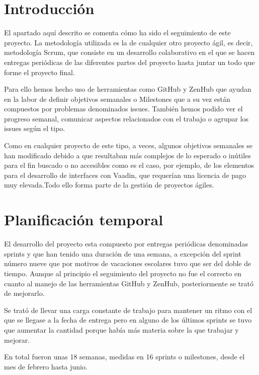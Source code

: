 
\section{Introducción}

El apartado aquí descrito se comenta cómo ha sido el seguimiento de este  proyecto. La metodología utilizada es la de cualquier otro proyecto ágil, es decir, metodología Scrum, que consiste en un desarrollo colaborativo en el que se hacen entregas periódicas de las diferentes partes del proyecto hasta juntar un todo que forme el proyecto final. 

Para ello hemos hecho uso de herramientas como GitHub y ZenHub que ayudan en la labor de definir objetivos semanales o Milestones que a su vez están compuestos por problemas denominados issues. También hemos podido ver el progreso semanal, comunicar aspectos relacionados con el trabajo o agrupar los issues según el tipo.

Como en cualquier proyecto de este tipo, a veces, algunos objetivos semanales se han modificado debido a que resultaban más complejos de lo esperado o inútiles para el fin buscado o no accesibles como es el caso, por ejemplo, de los elementos para el desarrollo de interfaces con Vaadin, que requerían una licencia de pago muy elevada.Todo ello forma parte de la gestión de proyectos ágiles.

\section{Planificación temporal}

El desarrollo del proyecto esta compuesto por entregas periódicas denominadas sprints y que han tenido una duración de una semana, a excepción del sprint número nueve que por motivos de vacaciones escolares tuvo que ser del doble de tiempo. Aunque al principio el seguimiento del proyecto no fue el correcto en cuanto al manejo de las herramientas GitHub  y ZenHub, posteriormente se trató de mejorarlo.

Se trató de llevar una carga constante de trabajo para mantener un ritmo con el que se llegase a la fecha de entrega pero en alguno de los últimos sprints se tuvo que aumentar la cantidad porque había más materia sobre la que trabajar y mejorar.

En total fueron unas 18 semanas, medidas en 16 sprints o milestones, desde el mes de febrero hasta junio.


